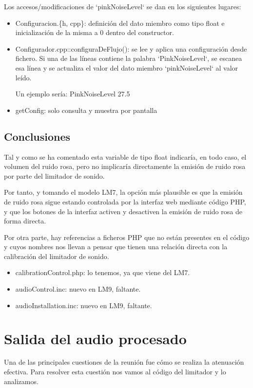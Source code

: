 \documentclass[]{article}
\begin{document}
Los accesos/modificaciones de `pinkNoiseLevel` se dan en los siguientes lugares:

\begin{itemize}
	\item Configuracion.\{h, cpp\}: definición del dato miembro como tipo float e inicialización de la misma a 0 dentro del constructor.
	\item Configurador.cpp::configuraDeFlujo(): se lee y aplica una configuración desde fichero. Si una de las líneas contiene la palabra `PinkNoiseLevel`, se escanea esa línea y se actualiza el valor del dato miembro `pinkNoiseLevel` al valor leído. 
	\par Un ejemplo sería: PinkNoiseLevel 27.5
	\item getConfig: solo consulta y muestra por pantalla
\end{itemize}

\subsection{Conclusiones}
Tal y como se ha comentado esta variable de tipo float indicaría, en todo caso, el volumen del ruido rosa, pero no implicaría directamente la emisión de ruido rosa por parte del limitador de sonido.

Por tanto, y tomando el modelo LM7, la opción más plausible es que la emisión de ruido rosa sigue estando controlada por la interfaz web mediante código PHP, y que los botones de la interfaz activen y desactiven la emisión de ruido rosa de forma directa.

Por otra parte, hay referencias a ficheros PHP que no están presentes en el código y cuyos nombres nos llevan a pensar que tienen una relación directa con la calibración del limitador de sonido.

\begin{itemize}
	\item calibrationControl.php: lo tenemos, ya que viene del LM7.
	\item audioControl.inc: nuevo en LM9, faltante.
	\item audioInstallation.inc: nuevo en LM9, faltante.
\end{itemize}

\section{Salida del audio procesado}
Una de las principales cuestiones de la reunión fue cómo se realiza la atenuación efectiva. Para resolver esta cuestión nos vamos al código del limitador y lo analizamos.
\end{document}
